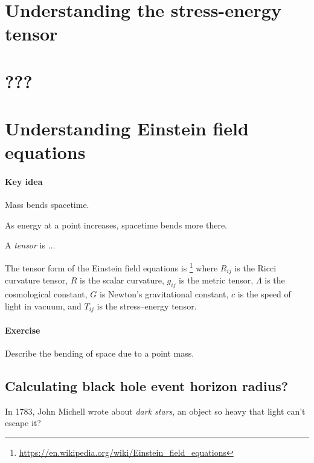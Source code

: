 \section{Understanding the stress-energy tensor}

\section{???}

\section{Understanding Einstein field equations}

\paragraph{Key idea}
Mass bends spacetime.

As energy at a point increases, spacetime bends more there.


A \emph{tensor} is ...

The tensor form of the Einstein field equations is%
\footnote{\url{https://en.wikipedia.org/wiki/Einstein_field_equations}}
where \(R_{ij}\) is the Ricci curvature tensor, \(R\) is the scalar curvature, \(g_{ij}\) is the metric tensor,
\(\Lambda\) is the cosmological constant, \(G\) is Newton's gravitational constant, \(c\) is the speed of light in vacuum,
and \(T_{ij}\) is the stress–energy tensor.

\paragraph{Exercise}
Describe the bending of space due to a point mass.

\subsection{Calculating black hole event horizon radius?}


In 1783, John Michell wrote about \emph{dark stars},
an object so heavy that light can't escape it?

